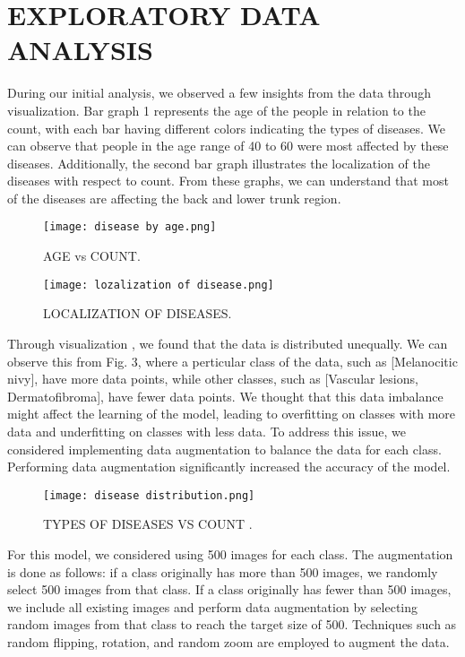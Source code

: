 \documentclass[conference]{IEEEtran}
\begin{document}
\section{EXPLORATORY DATA ANALYSIS}
During our initial analysis, we observed a few insights from the data through visualization. Bar graph 1 represents the age of the people in relation to the count, with each bar having different colors indicating the types of diseases. We can observe that people in the age range of 40 to 60 were most affected by these diseases. Additionally, the second bar graph illustrates the localization of the diseases with respect to count. From these graphs, we can understand that most of the diseases are affecting the back and lower trunk region.

\begin{figure}[htbp]
\centering
\texttt{[image: disease by age.png]}
\caption{ AGE vs COUNT.}
\label{fig}
\end{figure}

\begin{figure}[htbp]
\centering
\texttt{[image: lozalization of disease.png]}
\caption{ LOCALIZATION OF DISEASES.}
\label{fig}
\end{figure}

Through visualization , we found that the data is distributed unequally. We can observe this from Fig. 3, where a perticular class of the data, such as [Melanocitic nivy], have more data points, while other classes, such as [Vascular lesions, Dermatofibroma], have fewer data points. We thought that this data imbalance might affect the learning of the model, leading to overfitting on classes with more data and underfitting on classes with less data. To address this issue, we considered implementing data augmentation to balance the data for each class. Performing data augmentation significantly increased the accuracy of the model.

\begin{figure}[htbp]
\centering
\texttt{[image: disease distribution.png]}
\caption{TYPES OF DISEASES VS COUNT .}
\label{fig}
\end{figure}

For this model, we considered using 500 images for each class. The augmentation is done as follows: if a class originally has more than 500 images, we randomly select 500 images from that class. If a class originally has fewer than 500 images, we include all existing images and perform data augmentation by selecting random images from that class to reach the target size of 500. Techniques such as random flipping, rotation, and random zoom are employed to augment the data.
\end{document}
